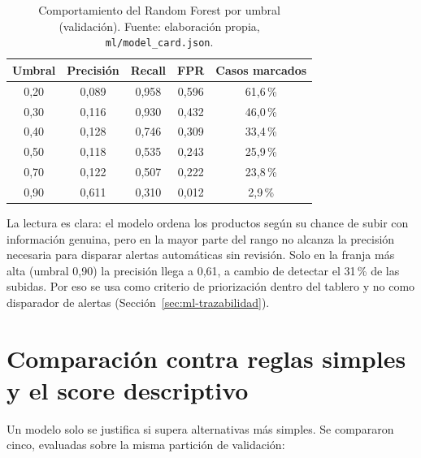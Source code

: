 \begin{table}[H]
	\centering
	\small
	\caption{Comportamiento del Random Forest por umbral (validación). Fuente: elaboración propia, \texttt{ml/model\_card.json}.}
	\label{tab:ml-umbrales}
	\begin{tabular}{@{}ccccc@{}}
		\toprule
		\textbf{Umbral} & \textbf{Precisión} & \textbf{Recall} & \textbf{FPR} & \textbf{Casos marcados} \\
		\midrule
		0,20 & 0,089 & 0,958 & 0,596 & 61,6\,\% \\
		0,30 & 0,116 & 0,930 & 0,432 & 46,0\,\% \\
		0,40 & 0,128 & 0,746 & 0,309 & 33,4\,\% \\
		0,50 & 0,118 & 0,535 & 0,243 & 25,9\,\% \\
		0,70 & 0,122 & 0,507 & 0,222 & 23,8\,\% \\
		0,90 & 0,611 & 0,310 & 0,012 & 2,9\,\% \\
		\bottomrule
	\end{tabular}
\end{table}

La lectura es clara: el modelo ordena los productos según su chance de subir con información genuina, pero en la mayor parte del rango no alcanza la precisión necesaria para disparar alertas automáticas sin revisión. Solo en la franja más alta (umbral 0,90) la precisión llega a 0,61, a cambio de detectar el 31\,\% de las subidas. Por eso se usa como criterio de priorización dentro del tablero y no como disparador de alertas (Sección~\ref{sec:ml-trazabilidad}).

\section{Comparación contra reglas simples y el score descriptivo}\label{sec:ml-baselines}

Un modelo solo se justifica si supera alternativas más simples. Se compararon cinco, evaluadas sobre la misma partición de validación:

